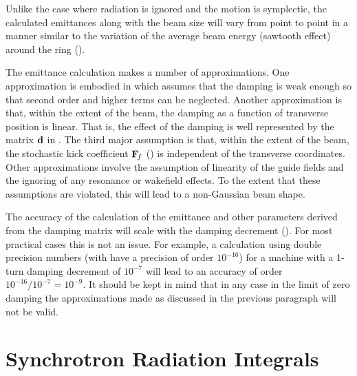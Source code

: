 Unlike the case where radiation is ignored and the motion is symplectic, the calculated emittances
along with the beam size will vary from point to point in a manner similar to the variation of the average
beam energy (sawtooth effect) around the ring ().

The emittance calculation makes a number of approximations. One approximation is embodied in
 which assumes that the damping is weak enough so that second order and higher terms can be
neglected. Another approximation is that, within the extent of the beam, the damping as a function
of transverse position is linear. That is, the effect of the damping is well represented by the
matrix ${\bf d}$ in . The third major assumption is that, within the extent of the beam, the
stochastic kick coefficient ${\bf F}_{\mkern-3 mu{f}}$ () is independent of the transverse coordinates.
Other approximations involve the assumption of linearity of the guide fields and the ignoring of any
resonance or wakefield effects. To the extent that these assumptions are violated, this will lead to
a non-Gaussian beam shape.

The accuracy of the calculation of the emittance and other parameters derived from the damping
matrix will scale with the damping decrement ().  For most practical cases this is not an
issue. For example, a calculation using double precision numbers (with have a precision of order
$10^{-16}$) for a machine with a 1-turn damping decrement of $10^{-7}$ will lead to an accuracy of
order $10^{-16}/10^{-7} = 10^{-9}$. It should be kept in mind that in any case in the limit of zero
damping the approximations made as discussed in the previous paragraph will not be valid.

\section{Synchrotron Radiation Integrals}
\label{s:synch.ints}

